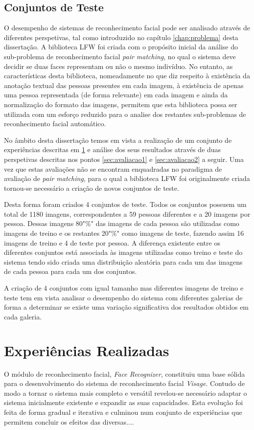\subsection{Conjuntos de Teste}  \label{sec:conjuntos}
O desempenho de sistemas de reconhecimento facial pode ser analisado através de diferentes perspetivas, tal como introduzido no capítulo \ref{chap:problema} desta dissertação. A biblioteca LFW foi criada com o propósito inicial da análise do sub-problema de reconhecimento facial \textit{pair matching}, no qual o sistema deve decidir se duas faces representam ou não o mesmo indivíduo. No entanto, as características desta biblioteca, nomeadamente no que diz respeito à existência da anotação textual das pessoas presentes em cada imagem, à existência de apenas uma pessoa representada (de forma relevante) em cada imagem e ainda da normalização do formato das imagens, permitem que esta biblioteca possa ser utilizada com um esforço reduzido para o analise dos restantes sub-problemas de reconhecimento facial automático.

No âmbito desta dissertação temos em vista a realização de um conjunto de experiências descritas em \ref{sec:experiencias} e análise dos seus resultados através de duas perspetivas descritas nos pontos \ref{sec:avaliacao1} e \ref{sec:avaliacao2} a seguir. Uma vez que estas avaliações não se encontram enquadradas no paradigma de avaliação de \textit{pair matching}, para o qual a biblioteca LFW foi originalmente criada tornou-se necessário a criação de novos conjuntos de teste. 

Desta forma foram criados 4 conjuntos de teste. Todos os conjuntos possuem um total de 1180 imagens, correspondentes a 59 pessoas diferentes e a 20 imagens por pessoa. Dessas imagens 80"\%" das imagens de cada pessoa são utilizadas como imagens de treino e os restantes 20"\%" como imagens de teste, fazendo assim 16 imagens de treino e 4 de teste por pessoa. A diferença existente entre os diferentes conjuntos está associada às imagens utilizadas como treino e teste do sistema tendo sido criada uma distribuição aleatória para cada um das imagens de cada pessoa para cada um dos conjuntos.

A criação de 4 conjuntos com igual tamanho mas diferentes imagens de treino e teste tem em vista analisar o desempenho do sistema com diferentes galerias de forma a determinar se existe uma variação significativa dos resultados obtidos em cada galeria.

\section{Experiências Realizadas} \label{sec:experiencias}
O módulo de reconhecimento facial, \textit{Face Recognizer}, constituiu uma base sólida para o desenvolvimento do sistema de reconhecimento facial \textit{Visage}. Contudo de modo a tornar o sistema mais completo e versátil revelou-se necessário adaptar o sistema inicialmente existente e expandir as suas capacidades. Esta evolução foi feita de forma gradual e iterativa e culminou num conjunto de experiências que permitem concluir os efeitos das diversas....

